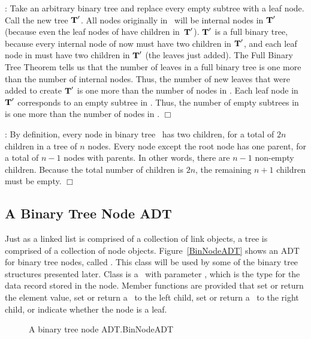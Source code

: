 :
Take an arbitrary binary tree  and replace every
empty subtree with a leaf node.
Call the new tree \({\textbf{T}}'\).
All nodes originally in~ will be internal nodes in
\({\textbf{T}}'\) (because even the leaf nodes of  have children
in~\({\textbf{T}}'\)).
\({\textbf{T}}'\) is a full binary tree, because every internal node of
 now must have two children in \({\textbf{T}}'\), and each leaf node
in  must have two children in \({\textbf{T}}'\)
(the leaves just added).
The Full Binary Tree Theorem tells us that the number of leaves
in a full binary tree is one more than the number of internal nodes.
Thus, the number of new leaves that were added to create
\({\textbf{T}}'\) is one more than the number of nodes in .
Each leaf node in \({\textbf{T}}'\) corresponds to an
empty subtree in .
Thus, the number of empty subtrees in  is one more
than the number of nodes in .
\hfill\(\Box\)
\bigskip

:
By definition, every node in binary tree~ has two children,
for a total of \(2n\) children in a tree of \(n\) nodes.
Every node except the root node has one parent, for a total of
\(n-1\) nodes with parents.
In other words, there are \(n-1\) non-empty children.
Because the total number of children is \(2n\), the remaining \(n+1\)
children must be empty.
\hfill\(\Box\)

\subsection{A Binary Tree Node ADT}
\label{BinADT}

Just as a linked list is comprised of a collection of link objects, a
tree is comprised of a collection of node objects.
Figure~\ref{BinNodeADT} shows an ADT for binary tree nodes, called
.
This class will be used by some of the binary tree structures presented
later.
Class  is a \Gen\ with parameter , which
is the type for the data record stored in the node.
Member functions are provided that set or return the element value,
set or return a \pointref\ to the left child,
set or return a \pointref\ to the right child,
or indicate whether the node is a leaf.

\begin{figure}
\vspace{-\bigskipamount}
\vspace{-\medskipamount}
{A binary tree node ADT.}{BinNodeADT}
\end{figure}

